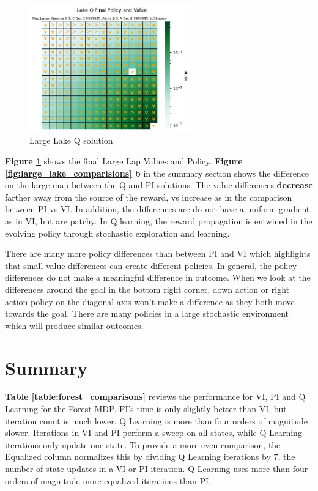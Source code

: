 \documentclass[letterpaper]{article} %
\begin{document}
\begin{figure}[!htb]
\centering
\includegraphics[width=2.75in]{Figures/Lake_Q_Final_Policy_and_Value_Map_Large__Gamma_0_9__E_Dec_0_9999995__Alpha_0_5__A_Dec_0_9999995__Is_Slippery.png}
\caption{Large Lake Q solution}
\label{fig:lake_q_large_solution}
\end{figure}

\textbf{Figure \ref{fig:lake_q_large_solution}} shows the final Large Lap Values and Policy.   \textbf{Figure \ref{fig:large_lake_comparisions} b} in the summary section shows the difference on the large map between the Q and PI solutions.  The value differences \textbf{decrease} farther away from the source of the reward, vs increase as in the comparison between PI vs VI.  In addition, the differences are do not have a uniform gradient as in VI, but are patchy.  In Q learning, the reward propagation is entwined in the evolving policy through stochastic exploration and learning. 

There are many more policy differences than between PI and VI which highlights that small value differences can create different policies.  In general, the policy differences do not make a meaningful difference in outcome.  When we look at the differences around the goal in the bottom right corner,  down action or right action policy on the diagonal axis won't make a difference as they both move towards the goal.  There are many policies in a large stochastic environment which will produce similar outcomes.

\section{Summary}

\textbf{Table \ref{table:forest_comparisons}} reviews the performance for VI, PI and Q Learning for the Forest MDP.  PI's time is only slightly better than VI, but iteration count is much lower.  Q Learning is more than four orders of magnitude slower.  Iterations in VI and PI perform a sweep on all states, while Q Learning iterations only update one state.  To provide a more even comparison, the Equalized column normalizes this by dividing Q Learning iterations by 7, the number of state updates in a VI or PI iteration.  Q Learning uses more than four orders of magnitude more equalized iterations than PI.
\end{document}

